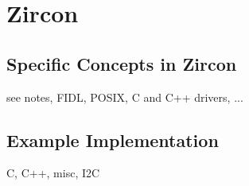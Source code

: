 
\section{Zircon} \label{sec:cs-zircon}


\subsection{Specific Concepts in Zircon} \label{subsec:concepts-zircon}
    see notes, FIDL, POSIX, C and C++ drivers, ...

\subsection{Example Implementation} %
    C, C++, misc, I2C

